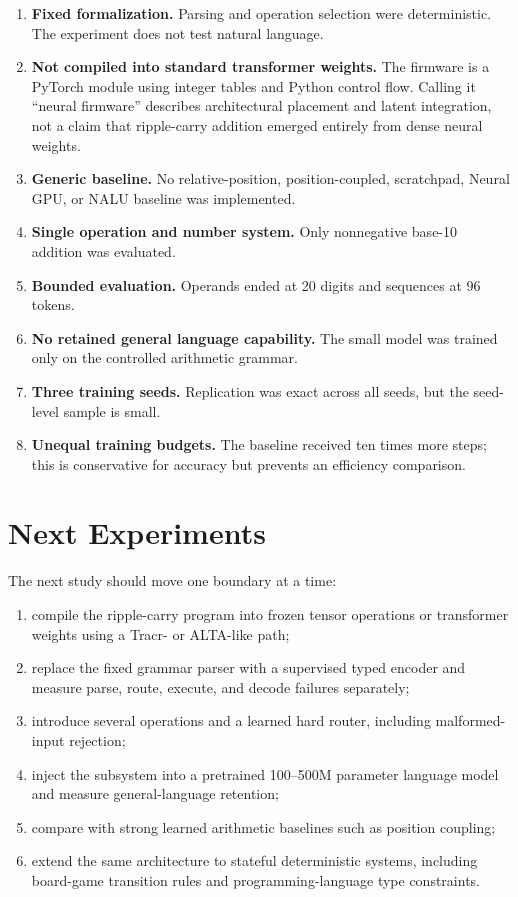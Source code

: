 \documentclass[11pt]{article}
\begin{document}
\begin{enumerate}
    \item \textbf{Fixed formalization.} Parsing and operation selection were
    deterministic. The experiment does not test natural language.
    \item \textbf{Not compiled into standard transformer weights.} The
    firmware is a PyTorch module using integer tables and Python control flow.
    Calling it ``neural firmware'' describes architectural placement and latent
    integration, not a claim that ripple-carry addition emerged entirely from
    dense neural weights.
    \item \textbf{Generic baseline.} No relative-position, position-coupled,
    scratchpad, Neural GPU, or NALU baseline was implemented.
    \item \textbf{Single operation and number system.} Only nonnegative
    base-10 addition was evaluated.
    \item \textbf{Bounded evaluation.} Operands ended at 20 digits and sequences
    at 96 tokens.
    \item \textbf{No retained general language capability.} The small model was
    trained only on the controlled arithmetic grammar.
    \item \textbf{Three training seeds.} Replication was exact across all
    seeds, but the seed-level sample is small.
    \item \textbf{Unequal training budgets.} The baseline received ten times
    more steps; this is conservative for accuracy but prevents an efficiency
    comparison.
\end{enumerate}

\section{Next Experiments}

The next study should move one boundary at a time:

\begin{enumerate}
    \item compile the ripple-carry program into frozen tensor operations or
    transformer weights using a Tracr- or ALTA-like path;
    \item replace the fixed grammar parser with a supervised typed encoder and
    measure parse, route, execute, and decode failures separately;
    \item introduce several operations and a learned hard router, including
    malformed-input rejection;
    \item inject the subsystem into a pretrained 100--500M parameter language
    model and measure general-language retention;
    \item compare with strong learned arithmetic baselines such as position
    coupling;
    \item extend the same architecture to stateful deterministic systems,
    including board-game transition rules and programming-language type
    constraints.
\end{enumerate}
\end{document}
